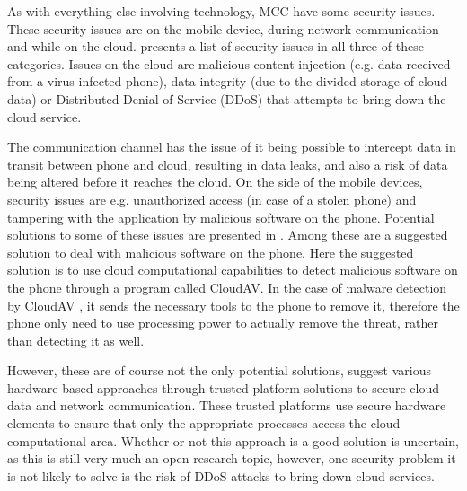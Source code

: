 As with everything else involving technology, MCC have some security issues.
These security issues are on the mobile device, during network communication and while on the cloud.
\citet{6923101} presents a list of security issues in all three of these categories. 
Issues on the cloud are malicious content injection (e.g. data received from a virus infected phone), data integrity (due to the divided storage of cloud data) or Distributed Denial of Service (DDoS) that attempts to bring down the cloud service.

The communication channel has the issue of it being possible to intercept data in transit between phone and cloud, resulting in data leaks, and also a risk of data being altered before it reaches the cloud.
On the side of the mobile devices, security issues are e.g. unauthorized access (in case of a stolen phone) and tampering with the application by malicious software on the phone.
Potential solutions to some of these issues are presented in \citet{6583635}.
Among these are a suggested solution to deal with malicious software on the phone.
Here the suggested solution is to use cloud computational capabilities to detect malicious software on the phone through a program called CloudAV.
In the case of malware detection by CloudAV \citep{Oberheide:2008:CNA:1496711.1496718}, it sends the necessary tools to the phone to remove it, therefore the phone only need to use processing power to actually remove the threat, rather than detecting it as well.

However, these are of course not the only potential solutions, \citet{7056876} suggest various hardware-based approaches through trusted platform solutions to secure cloud data and network communication.
These trusted platforms use secure hardware elements to ensure that only the appropriate processes access the cloud computational area.
Whether or not this approach is a good solution is uncertain, as this is still very much an open research topic, however, one security problem it is not likely to solve is the risk of DDoS attacks to bring down cloud services.

